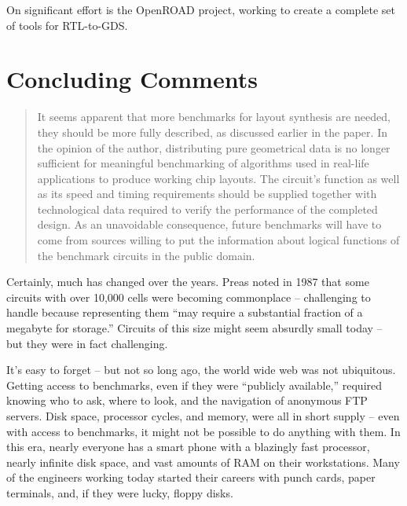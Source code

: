 \documentclass[sigconf]{acmart}
\begin{document}
On significant effort is the OpenROAD\cite{Ajayi19} project,
working to create a complete set of tools for RTL-to-GDS.




\section{Concluding Comments}

\begin{quote}
It seems apparent that more benchmarks for layout synthesis are
needed, they should be more fully described, as discussed earlier in
the paper. In the opinion of the author, distributing pure
geometrical data is no longer sufficient for meaningful benchmarking
of algorithms used in real-life applications to produce working chip
layouts. The circuit's function as well as its speed and timing
requirements should be supplied together with technological data
required to verify the performance of the completed design. As an
unavoidable consequence, future benchmarks will have to come from
sources willing to put the information about logical functions of the
benchmark circuits in the public domain.
\end{quote}


Certainly, much has changed over the years.  Preas\cite{Preas87}
noted in 1987 that some circuits with over 10,000 cells were becoming
commonplace -- challenging to handle because representing them
``may require a substantial fraction of a megabyte for storage.''
Circuits of this size might seem absurdly small today -- but they
were in fact challenging.

It's easy to forget -- but not so long ago, the world wide web was not
ubiquitous. Getting access to benchmarks, even if they were ``publicly
available,'' required knowing who to ask, where to look, and the
navigation of anonymous FTP servers.  Disk space, processor cycles,
and memory, were all in short supply -- even with access to
benchmarks, it might not be possible to do anything with them.  In
this era, nearly everyone has a smart phone with a blazingly fast
processor, nearly infinite disk space, and vast amounts of RAM on
their workstations.  Many of the engineers working today started their
careers with punch cards, paper terminals, and, if they were lucky,
floppy disks.



\balance


\end{document}
